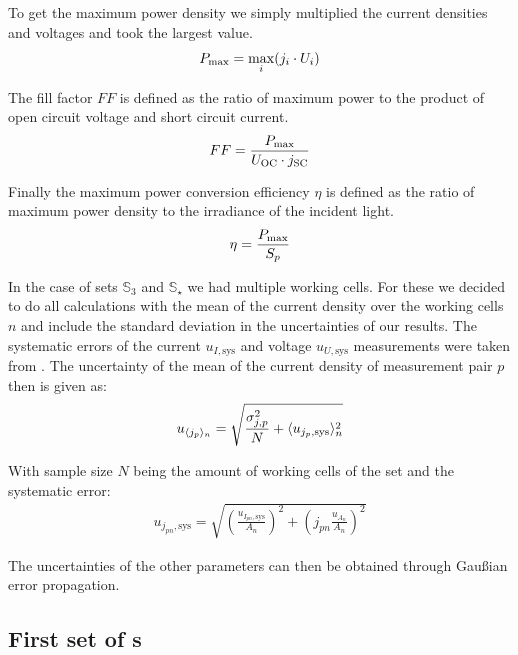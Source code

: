 To get the maximum power density we simply multiplied the current densities and voltages and took the largest value.
\begin{align}
P_{\text{max}} = \max_{i} (j_i\cdot U_i)
\end{align}

The fill factor $FF$ is defined as the ratio of maximum power to the product of open circuit voltage and short circuit current.
\begin{align}
FF = \frac{P_{\text{max}}}{U_{\text{OC}} \cdot j_{\text{SC}}}
\end{align}

Finally the maximum power conversion efficiency $\eta$ is defined as the ratio of maximum power density to the irradiance of the incident light.
\begin{align}
\eta = \frac{P_{\text{max}}}{S_p}
\end{align}

In the case of sets $\mathbb{S}_3$ and $\mathbb{S}_\star$ we had multiple working cells. For these we decided to do all calculations with the mean of the current density over the working cells $n$ and include the standard deviation in the uncertainties of our results. The systematic errors of the current $u_{I,\text{sys}}$ and voltage $u_{U,\text{sys}}$ measurements were taken from \cite{keithley}. The uncertainty of the mean of the current density of measurement pair $p$ then is given as:
\begin{align}
u_{\langle j_p \rangle_n} = \sqrt{\frac{\sigma_{j,p}^2}{N} + \langle u_{j_p,\text{sys}} \rangle_n^2}
\end{align}

With sample size $N$ being the amount of working cells of the set and the systematic error:
\begin{align}
u_{j_{pn},\text{sys}} = \sqrt{ \left( \frac{ u_{I_{pn},\text{sys}}}{A_n}\right)^2+\left( j_{pn}\frac{u_{A_n}}{A_n} \right)^2}
\end{align}

The uncertainties of the other parameters can then be obtained through Gaußian error propagation.

\subsection{First set of \BHSC s}\label{subsec:S1data}

